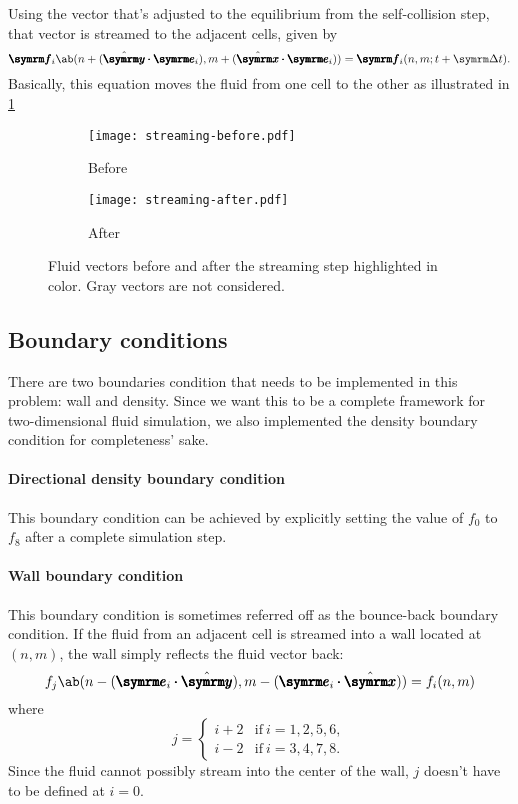 Using the vector that's adjusted to the equilibrium from the self-collision step, that vector is streamed to the adjacent cells, given by
\begin{equation}
	\vv{f}_i\ab(n + (\yhat \vdot \vv{e}_i), m + (\xhat \vdot \vv{e}_i)) = \vv{f}_i(n, m; t + \Dd{t}).
\end{equation}
Basically, this equation moves the fluid from one cell to the other as illustrated in \cref{fig:streaming-step}
\begin{figure}
	\centering
	\begin{subfigure}{0.45\textwidth}
		\centering
		\texttt{[image: streaming-before.pdf]}
		\caption{Before}
	\end{subfigure}
	\begin{subfigure}{0.45\textwidth}
		\centering
		\texttt{[image: streaming-after.pdf]}
		\caption{After}
	\end{subfigure}
	\caption{Fluid vectors before and after the streaming step highlighted in color. Gray vectors are not considered.}
	\label{fig:streaming-step}
\end{figure}

\subsection{Boundary conditions}

There are two boundaries condition that needs to be implemented in this problem: wall and density. Since we want this to be a complete framework for two-dimensional fluid simulation, we also implemented the density boundary condition for completeness' sake.

\paragraph{Directional density boundary condition} This boundary condition can be achieved by explicitly setting the value of $f_0$ to $f_8$ after a complete simulation step.

\paragraph{Wall boundary condition} This boundary condition is sometimes referred off as the bounce-back boundary condition. If the fluid from an adjacent cell is streamed into a wall located at $(n, m)$, the wall simply reflects the fluid vector back:
\begin{equation}
	f_j\ab(n - (\vv{e}_i \vdot \yhat), m - (\vv{e}_i \vdot \xhat)) = f_i(n, m) \label{eq:wall-boundary-calculation}
\end{equation}
where
\begin{equation}
	j = \begin{cases}
		i + 2 & \textrm{if} ~ i = 1, 2, 5, 6, \\
		i - 2 & \textrm{if} ~ i = 3, 4, 7, 8.
	\end{cases} \label{eq:wall-boundary-calculation-relation}
\end{equation}
Since the fluid cannot possibly stream into the center of the wall, $j$ doesn't have to be defined at $i = 0$. \cite{adams-no-date}

